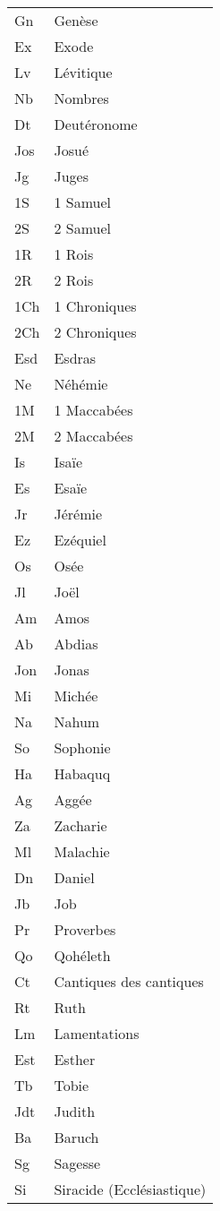 \begin{longtable}{ll}
Gn	&	Genèse\\
Ex	&	Exode\\
Lv	&	Lévitique\\
Nb	&	Nombres\\
Dt	&	Deutéronome\\
Jos	&	Josué\\
Jg	&	Juges\\
1S	&	1 Samuel\\
2S	&	2 Samuel\\
1R	&	1 Rois\\
2R	&	2 Rois\\
1Ch	&	1 Chroniques\\
2Ch	&	2 Chroniques\\
Esd	&	Esdras\\
Ne	&	Néhémie\\
1M	&	1 Maccabées\\
2M	&	2 Maccabées\\
Is	&	Isaïe\\
Es	&	Esaïe\\
Jr	&	Jérémie\\
Ez	&	Ezéquiel\\
Os	&	Osée\\
Jl	&	Joël\\
Am	&	Amos\\
Ab	&	Abdias\\
Jon	&	Jonas\\
Mi	&	Michée\\
Na	&	Nahum\\
So	&	Sophonie\\
Ha	&	Habaquq\\
Ag	&	Aggée\\
Za	&	Zacharie\\
Ml	&	Malachie\\
Dn	&	Daniel\\
Jb	&	Job\\
Pr	&	Proverbes\\
Qo	&	Qohéleth\\
Ct	&	Cantiques des cantiques\\
Rt	&	Ruth\\
Lm	&	Lamentations\\
Est	&	Esther\\
Tb	&	Tobie\\
Jdt	&	Judith\\
Ba	&	Baruch\\
Sg	&	Sagesse\\
Si	&	Siracide (Ecclésiastique)\\

\end{longtable}
